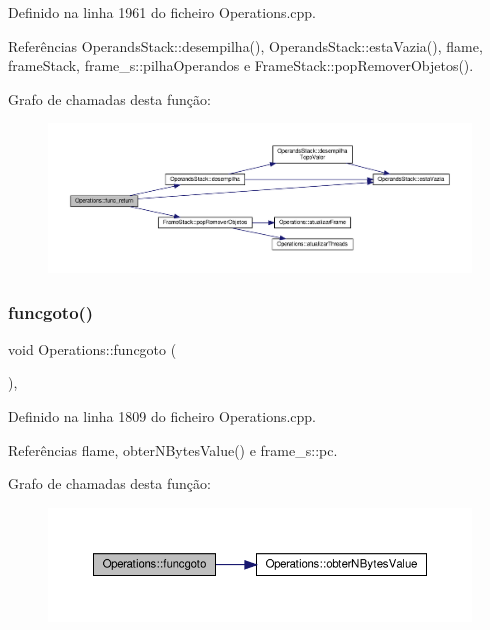 Definido na linha 1961 do ficheiro Operations.\+cpp.



Referências Operands\+Stack\+::desempilha(), Operands\+Stack\+::esta\+Vazia(), flame, frame\+Stack, frame\+\_\+s\+::pilha\+Operandos e Frame\+Stack\+::pop\+Remover\+Objetos().

Grafo de chamadas desta função\+:
\nopagebreak
\begin{figure}[H]
\begin{center}
\leavevmode
\includegraphics[width=350pt]{classOperations_aa33b77fb62f7e76c347503c97c6b080b_cgraph}
\end{center}
\end{figure}
\mbox{\label{classOperations_a63d1d75decab8e709a6c5da5e59d8188}} 
\subsubsection{\texorpdfstring{funcgoto()}{funcgoto()}}
{\footnotesize\ttfamily void Operations\+::funcgoto (\begin{DoxyParamCaption}{ }\end{DoxyParamCaption})\hspace{0.3cm}{\ttfamily [static]}, {\ttfamily [private]}}



Definido na linha 1809 do ficheiro Operations.\+cpp.



Referências flame, obter\+N\+Bytes\+Value() e frame\+\_\+s\+::pc.

Grafo de chamadas desta função\+:
\nopagebreak
\begin{figure}[H]
\begin{center}
\leavevmode
\includegraphics[width=350pt]{classOperations_a63d1d75decab8e709a6c5da5e59d8188_cgraph}
\end{center}
\end{figure}
\mbox{\label{classOperations_a1880a30623072f8388be782dcf1a390e}} 

